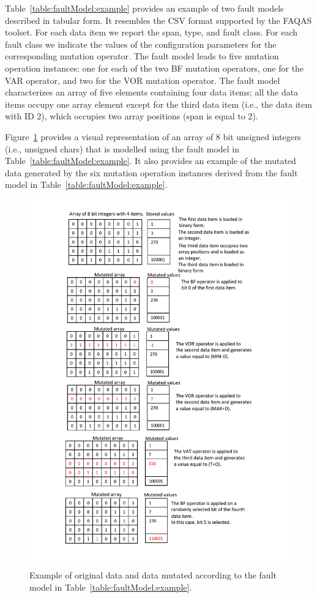 Table~\ref{table:faultModel:example} provides an example of two fault models described in tabular form. 
It resembles the CSV format supported by the FAQAS toolset. For each data item we report the span, type, and fault class. For each fault class we indicate the values of the configuration parameters for the corresponding mutation operator. The fault model  leads to five mutation operation instances: one for each of the two BF mutation operators, one for the VAR operator, and two for the VOR mutation operator. The fault model characterizes an array of five elements containing four data items; all the data items occupy one array element except for the third data item (i.e., the data item with ID 2), which occupies two array positions (span is equal to 2).

Figure~\ref{fig:dataMutationFMExamples} provides a visual representation of an array of 8 bit unsigned integers (i.e., unsigned chars) that is modelled using the  fault model in Table~\ref{table:faultModel:example}. It also provides an example of the mutated data generated by the six mutation operation instances derived from the fault model in Table~\ref{table:faultModel:example}.




\begin{figure}[h]
  \centering
    \includegraphics[width=12cm]{images/dataMutationFMExample.pdf}
      \caption{Example of original data and  data mutated according to the fault model in Table~\ref{table:faultModel:example}.}
      \label{fig:dataMutationFMExamples}
\end{figure}


